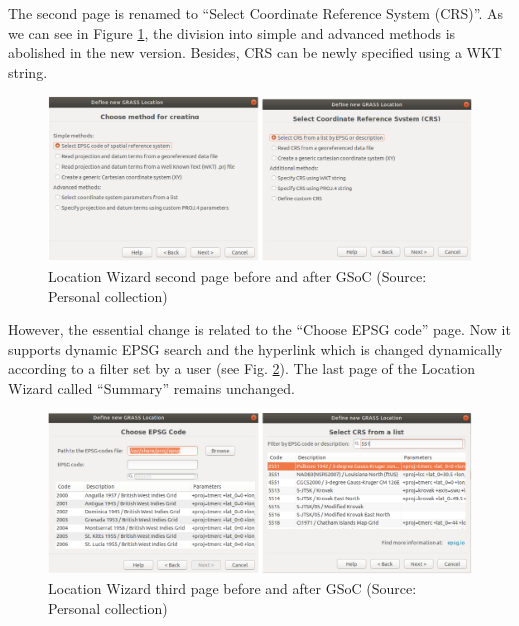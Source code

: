 \documentclass[a4paper,10pt,twoside]{article}
\begin{document}
\noindent The second page is renamed to ``Select Coordinate Reference System (CRS)''. As we can see in Figure \ref{fig:loc_wiz_2}, the division into simple and advanced methods is abolished in the new version. Besides, CRS can be newly specified using a WKT string.

\vspace{0.3cm}
\begin{figure}[hbt!] 
\begin{center}
\includegraphics[width=17cm]{../pictures/loc_wiz_2.png} 
\caption[Location Wizard second page before and after GSoC]{Location Wizard second page before and after GSoC (Source: Personal collection)}
\label{fig:loc_wiz_2}
\end{center}
\end{figure}

\noindent However, the essential change is related to the ``Choose EPSG code'' page. Now it supports dynamic EPSG search and the hyperlink which is changed dynamically according to a filter set by a user (see Fig. \ref{fig:loc_wiz_3}). The last page of the Location Wizard called ``Summary'' remains unchanged.

\vspace{0.3cm}
\begin{figure}[hbt!] 
\begin{center}
\includegraphics[width=17cm]{../pictures/loc_wiz_3.png} 
\caption[Location Wizard third page before and after GSoC)]{Location Wizard third page before and after GSoC (Source: Personal collection)}
\label{fig:loc_wiz_3}
\end{center}
\end{figure}
\end{document}
